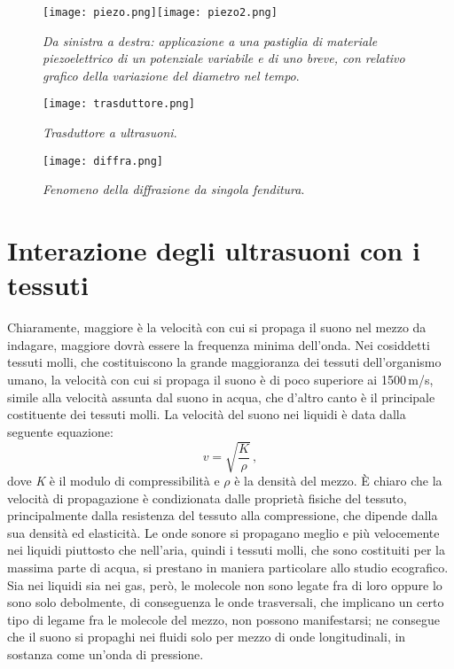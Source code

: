 \documentclass{report}
\numberwithin{equation}{section}
\numberwithin{figure}{section}
\begin{document}
\begin{figure}[htp]
\centering
\texttt{[image: piezo.png]}\quad\texttt{[image: piezo2.png]}
\caption{\label{fig:piezo} \textit{Da sinistra a destra: applicazione a una pastiglia di materiale piezoelettrico di un potenziale variabile e di uno breve, con relativo grafico della variazione del diametro nel tempo}.}
\end{figure}

\begin{figure}[htp]
\centering
\texttt{[image: trasduttore.png]}
\caption{\label{fig:trasduttore} \textit{Trasduttore a ultrasuoni}.}
\end{figure}

\begin{figure}[H]
\centering
\texttt{[image: diffra.png]}
\vspace{-20 pt}

\caption{\label{fig:diffra} \textit{Fenomeno della diffrazione da singola fenditura}.}
\end{figure}

\section{Interazione degli ultrasuoni con i tessuti}
Chiaramente, maggiore è la velocità con cui si propaga il suono nel mezzo da indagare, maggiore dovrà essere la frequenza minima dell'onda. Nei cosiddetti tessuti molli, che costituiscono la grande maggioranza dei tessuti dell'organismo umano, la velocità con cui si propaga il suono è di poco superiore ai 1500\,m/s, simile alla velocità assunta dal suono in acqua, che d'altro canto è il principale costituente dei tessuti molli. La velocità del suono nei liquidi è data dalla seguente equazione:
\begin{equation}
    v = \sqrt{\frac{K}{\rho}}\,,
\end{equation}
dove \textit{K} è il modulo di compressibilità e $\rho$ è la densità del mezzo. È chiaro che la velocità di propagazione è condizionata dalle proprietà fisiche del tessuto, principalmente dalla resistenza del tessuto alla compressione, che dipende dalla sua densità ed elasticità. Le onde sonore si propagano meglio e più velocemente nei liquidi piuttosto che nell'aria, quindi i tessuti molli, che sono costituiti per la massima parte di acqua, si prestano in maniera particolare allo studio ecografico. Sia nei liquidi sia nei gas, però, le molecole non sono legate fra di loro oppure lo sono solo debolmente, di conseguenza le onde trasversali, che implicano un certo tipo di legame fra le molecole del mezzo, non possono manifestarsi; ne consegue che il suono si propaghi nei fluidi solo per mezzo di onde longitudinali, in sostanza come un'onda di pressione.
\end{document}

